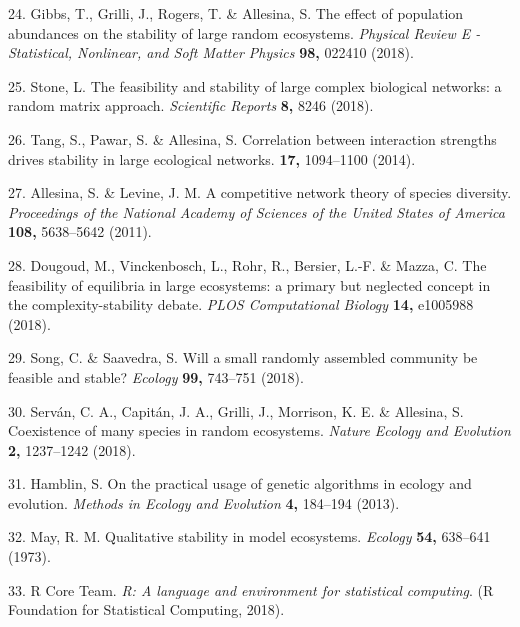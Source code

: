 \documentclass[]{article}
\begin{document}
\hypertarget{ref-Gibbs2017}{}
24. Gibbs, T., Grilli, J., Rogers, T. \& Allesina, S. The effect of
population abundances on the stability of large random ecosystems.
\emph{Physical Review E - Statistical, Nonlinear, and Soft Matter
Physics} \textbf{98,} 022410 (2018).

\hypertarget{ref-Stone2017}{}
25. Stone, L. The feasibility and stability of large complex biological
networks: a random matrix approach. \emph{Scientific Reports}
\textbf{8,} 8246 (2018).

\hypertarget{ref-Tang2014c}{}
26. Tang, S., Pawar, S. \& Allesina, S. Correlation between interaction
strengths drives stability in large ecological networks. \textbf{17,}
1094--1100 (2014).

\hypertarget{ref-Allesina2011}{}
27. Allesina, S. \& Levine, J. M. A competitive network theory of
species diversity. \emph{Proceedings of the National Academy of Sciences
of the United States of America} \textbf{108,} 5638--5642 (2011).

\hypertarget{ref-Dougoud2018}{}
28. Dougoud, M., Vinckenbosch, L., Rohr, R., Bersier, L.-F. \& Mazza, C.
The feasibility of equilibria in large ecosystems: a primary but
neglected concept in the complexity-stability debate. \emph{PLOS
Computational Biology} \textbf{14,} e1005988 (2018).

\hypertarget{ref-Song2018}{}
29. Song, C. \& Saavedra, S. Will a small randomly assembled community
be feasible and stable? \emph{Ecology} \textbf{99,} 743--751 (2018).

\hypertarget{ref-Servan2018}{}
30. Serván, C. A., Capitán, J. A., Grilli, J., Morrison, K. E. \&
Allesina, S. Coexistence of many species in random ecosystems.
\emph{Nature Ecology and Evolution} \textbf{2,} 1237--1242 (2018).

\hypertarget{ref-Hamblin2013}{}
31. Hamblin, S. On the practical usage of genetic algorithms in ecology
and evolution. \emph{Methods in Ecology and Evolution} \textbf{4,}
184--194 (2013).

\hypertarget{ref-May1973}{}
32. May, R. M. Qualitative stability in model ecosystems. \emph{Ecology}
\textbf{54,} 638--641 (1973).

\hypertarget{ref-Rproject}{}
33. R Core Team. \emph{R: A language and environment for statistical
computing}. (R Foundation for Statistical Computing, 2018).

\clearpage
\end{document}
